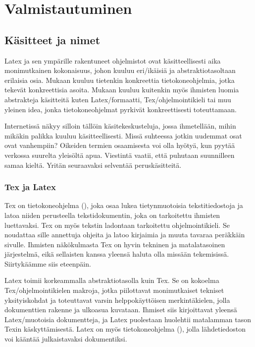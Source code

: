 \chapter{Valmistautuminen}

\section{Käsitteet ja nimet}

Latex ja sen ympärille rakentuneet ohjelmistot ovat käsitteellisesti
aika monimutkainen kokonaisuus, johon kuuluu eri\-/ikäisiä ja
abst\-rak\-tio\-ta\-sol\-taan erilaisia osia. Mukaan kuuluu tietenkin
konkreettia tie\-to\-kone\-oh\-jel\-mia, jotka tekevät konkreettisia
asoita. Mukaan kuuluu kuitenkin myös ihmisten luomia abst\-rak\-te\-ja
käsitteitä kuten Latex\-/formaatti, Tex\-/ohjelmointikieli tai muu
yleinen idea, jonka tieto\-kone\-ohjelmat pyrkivät konk\-reet\-ti\-sesti
toteuttamaan.

Internetissä näkyy silloin tällöin käsitekeskusteluja, jossa
ihmetellään, mihin mikäkin palikka kuuluu käsitteellisesti. Missä
suhteessa jotkin uudemmat osat ovat vanhempiin? Oikeiden termien
osaamisesta voi olla hyötyä, kun pyytää verkossa suurelta yleisöltä
apua. Viestintä vaatii, että puhutaan suunnilleen samaa kieltä. Yritän
seuraavaksi selventää peruskäsitteitä.

\subsection{Tex ja Latex}

Tex on tietokone\-ohjelma (), joka osaa lukea tietynmuotoisia
tekstitiedostoja ja latoa niiden perusteella tekstidokumentin, joka on
tarkoitettu ihmisten luettavaksi. Tex on myös tekstin ladontaan
tarkoitettu ohjelmointikieli. Se noudattaa sille annettuja ohjeita ja
latoo kirjaimia ja muuta tavaraa peräkkäin sivulle. Ihmisten
näkökulmasta Tex on hyvin tekninen ja matalatasoinen järjestelmä, eikä
sellaisten kanssa yleensä haluta olla missään tekemisissä. Siirtykäämme
siis eteenpäin.

Latex toimii korkeammalla abstraktiotasolla kuin Tex. Se on kokoelma
Tex\-/ohjelmointikielen makroja, jotka piilottavat monimutkaiset
tekniset yksityiskohdat ja toteuttavat varsin helppokäyttöisen
merkintäkielen, jolla dokumenttien rakenne ja ulko\-asua kuvataan.
Ihmiset siis kirjoittavat yleensä Latex\-/muotoisia dokumentteja, ja
Latex puolestaan huolehtii matalamman tason Texin käskyttämisestä. Latex
on myös tietokone\-ohjelma (), jolla lähdetiedoston voi
kääntää julkaistavaksi dokumentiksi.

